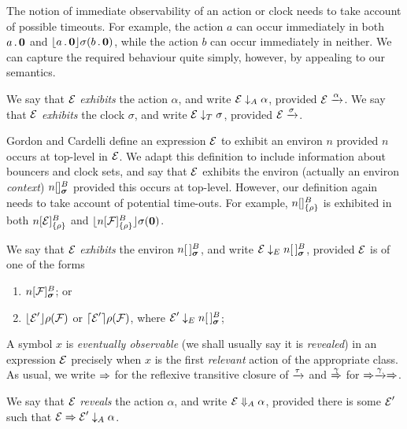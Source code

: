 \documentclass[orivec,envcountsame]{llncs}
\begin{document}
The notion of immediate observability of an action or clock needs to take
account of possible timeouts. For example, the action $a$ can occur immediately
in both $a\,.\,\textbf{0}$ and $\lfloor{a\,.\,\textbf{0}}\rfloor {\sigma} ({b\,.\,\textbf{0}})$, while the
action $b$ can occur immediately in neither. We can capture the required
behaviour quite simply, however, by appealing to our semantics.

\begin{definition}
We say that $\text{$\mathcal{E}$}$ \emph{exhibits} the action $\alpha$, and write $\text{$\mathcal{E}$}
\mathrel{\downarrow_{A}} \alpha$, provided $\text{$\mathcal{E}$} \xrightarrow{\alpha}$. We say that $\text{$\mathcal{E}$}$
\emph{exhibits} the clock $\sigma$, and write $\text{$\mathcal{E}$} \mathrel{\downarrow_{T}} \sigma$,
provided $\text{$\mathcal{E}$} \xrightarrow{\sigma}$.
\end{definition}

Gordon and Cardelli \cite{GC99} define an expression $\text{$\mathcal{E}$}$ to exhibit an
environ $n$ provided $n$ occurs at top-level in $\text{$\mathcal{E}$}$. We adapt this
definition to include information about bouncers and clock sets, and say that
$\text{$\mathcal{E}$}$ exhibits the environ (actually an environ \emph{context})
$\locv{n}{}{B}{\vec{\sigma}}$ provided this occurs at top-level. However, our
definition again needs to take account of potential time-outs. For example,
${n}[  ]^{B}_{\{\rho\}}$ is exhibited in both ${n}[ \text{$\mathcal{E}$} ]^{B}_{\{\rho\}}$ and
$\lfloor{{n}[ \text{$\mathcal{F}$}]^{B}_{\{\rho\}}}\rfloor {\sigma} ({\textbf{0}})$.

\begin{definition}
We say that $\text{$\mathcal{E}$}$ \emph{exhibits} the environ $\locv{n}{\,}{B}{\vec{\sigma}}$,
and write $\expr \ExhibitsE \locv{n}{\,}{B}{\vec{\sigma}}$, provided $\text{$\mathcal{E}$}$ is 
of one of the forms

\begin{enumerate}
\item
    $\locv{n}{\exprb}{B}{\vec{\sigma}}$; or
\item
    $\lfloor{\text{$\mathcal{E}$}' }\rfloor {\rho} ({\text{$\mathcal{F}$}})$ or $\lceil{\text{$\mathcal{E}$}' }\rceil {\rho} ({\text{$\mathcal{F}$}})$,
    where $\expr' \ExhibitsE \locv{n}{\,}{B}{\vec{\sigma}}$;
\end{enumerate}
\end{definition}


A symbol $x$ is \emph{eventually observable} (we shall usually say it
is \emph{revealed}) in an expression $\text{$\mathcal{E}$}$ precisely when $x$ is the
first \emph{relevant} action of the appropriate class. As usual, we
write $\mathrel{\Rightarrow}$ for the reflexive transitive closure of $\xrightarrow{\tau}$ and 
$\stackrel{\gamma}{\Rightarrow}$ for $\mathrel{\Rightarrow}\xrightarrow{\gamma}\mathrel{\Rightarrow}$.

\begin{definition}
We say that $\text{$\mathcal{E}$}$ \emph{reveals} the action $\alpha$, and write $\text{$\mathcal{E}$}
\mathrel{\Downarrow_{A}} \alpha$, provided there is some $\text{$\mathcal{E}$}'$ such that $\text{$\mathcal{E}$}
\mathrel{\Rightarrow} \text{$\mathcal{E}$}' \mathrel{\downarrow_{A}} \alpha$.
\end{definition}
\end{document}

